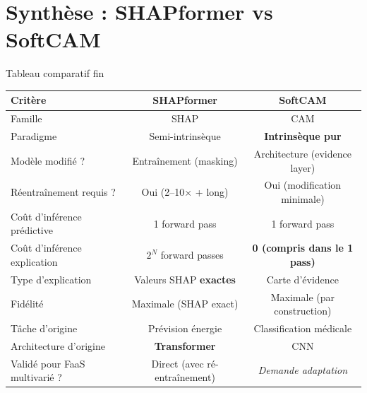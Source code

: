 \documentclass[10pt]{beamer}
\begin{document}
\section{Synthèse : SHAPformer vs SoftCAM}

\begin{frame}{Tableau comparatif fin}
  \begin{tcolorbox}[colback=blue!3, colframe=blue!50!black, arc=2mm, boxrule=0.5pt]
    \scriptsize
    \begin{tabular}{lcc}
      \toprule
      \textbf{Critère} & \textbf{SHAPformer} & \textbf{SoftCAM} \\
      \midrule
      Famille                       & SHAP                     & CAM \\
      Paradigme                     & Semi-intrinsèque         & \textbf{Intrinsèque pur} \\
      Modèle modifié ?              & Entraînement (masking)   & Architecture (evidence layer) \\
      Réentraînement requis ?       & Oui (2--10$\times$ + long) & Oui (modification minimale) \\
      Coût d'inférence prédictive   & 1 forward pass           & 1 forward pass \\
      Coût d'inférence explication  & $2^N$ forward passes     & \textbf{0 (compris dans le 1 pass)} \\
      Type d'explication            & Valeurs SHAP \textbf{exactes} & Carte d'évidence \\
      Fidélité                      & Maximale (SHAP exact)    & Maximale (par construction) \\
      Tâche d'origine               & Prévision énergie        & Classification médicale \\
      Architecture d'origine        & \textbf{Transformer}     & CNN \\
      Validé pour FaaS multivarié ?  & Direct (avec ré-entraînement) & \emph{Demande adaptation} \\
      \bottomrule
    \end{tabular}
  \end{tcolorbox}
\end{frame}
\end{document}
